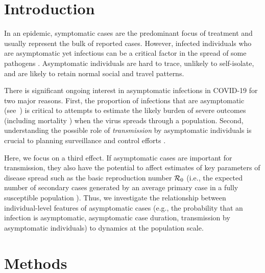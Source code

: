 \section{Introduction}

In an epidemic, symptomatic cases are the predominant focus of treatment and usually represent the bulk of reported cases. 
However, infected individuals who are asymptomatic yet infectious can be a critical factor in the spread of some pathogens \citep{fraser2004factors}.
Asymptomatic individuals are hard to trace, unlikely to self-isolate, and are likely to retain normal social and travel patterns.

There is significant ongoing interest in asymptomatic infections in COVID-19 for two major reasons. 
First, the proportion of infections that are asymptomatic (see~\citep{mizumoto_2020}) is critical to attempts to estimate the likely burden of severe outcomes (including mortality \citep{fauci_nejm2020}) when the virus spreads through a population.
Second, understanding the possible role of \emph{transmission} by asymptomatic individuals is crucial to planning surveillance and control efforts \citep{fraser2004factors}.

Here, we focus on a third effect. 
If asymptomatic cases are important for transmission, they also have the potential to affect estimates of key parameters of disease spread such as the basic reproduction number ${\cal{R}}_0$ (i.e., the expected number of secondary cases generated by an average primary case in a fully susceptible population \citep{anderson1992infectious}). 
Thus, we investigate the relationship between individual-level features of asymptomatic cases (e.g., the probability that an infection is asymptomatic, asymptomatic case duration, transmission by asymptomatic individuals) to dynamics at the population scale.

\section{Methods}

